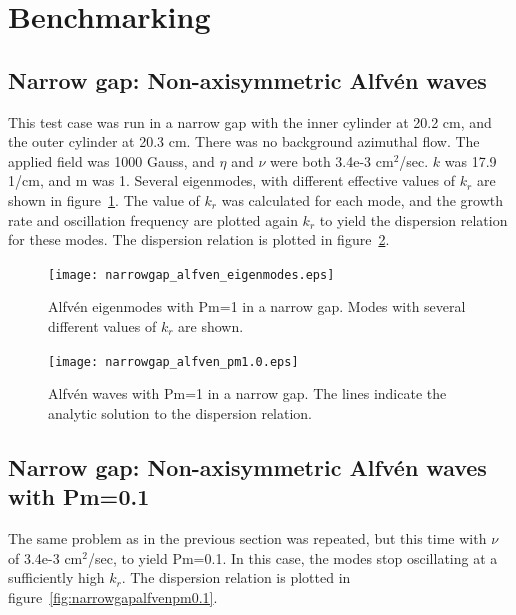 \documentclass[letterpaper]{article}
\begin{document}
\section{Benchmarking}

\subsection{Narrow gap: Non-axisymmetric Alfv\'en waves}

This test case was run in a narrow gap with the inner cylinder at 20.2
cm, and the outer cylinder at 20.3 cm.  There was no background
azimuthal flow.  The applied field was 1000 Gauss, and $\eta$ and
$\nu$ were both 3.4e-3 cm$^2$/sec.  $k$ was 17.9 1/cm, and m was 1.
Several eigenmodes, with different effective values of $k_r$ are shown
in figure~\ref{fig:narrowgapalfveneigenmodes}.  The value of $k_r$ was
calculated for each mode, and the growth rate and oscillation
frequency are plotted again $k_r$ to yield the dispersion relation for
these modes.  The dispersion relation is plotted in
figure~\ref{fig:narrowgapalfven}.

\begin{figure}
\begin{center}
\texttt{[image: narrowgap\_alfven\_eigenmodes.eps]}
\caption{Alfv\'en eigenmodes with Pm=1 in a narrow gap. Modes with
  several different values of $k_r$ are shown.}
\label{fig:narrowgapalfveneigenmodes}
\end{center}
\end{figure}

\begin{figure}
\begin{center}
\texttt{[image: narrowgap\_alfven\_pm1.0.eps]}
\caption{Alfv\'en waves with Pm=1 in a narrow gap.  The lines indicate
  the analytic solution to the dispersion relation.}
\label{fig:narrowgapalfven}
\end{center}
\end{figure}

\subsection{Narrow gap: Non-axisymmetric Alfv\'en waves with Pm=0.1}

The same problem as in the previous section was repeated, but this
time with $\nu$ of 3.4e-3 cm$^2$/sec, to yield Pm=0.1.  In this case,
the modes stop oscillating at a sufficiently high $k_r$.  The
dispersion relation is plotted in
figure~\ref{fig:narrowgapalfvenpm0.1}.
\end{document}
